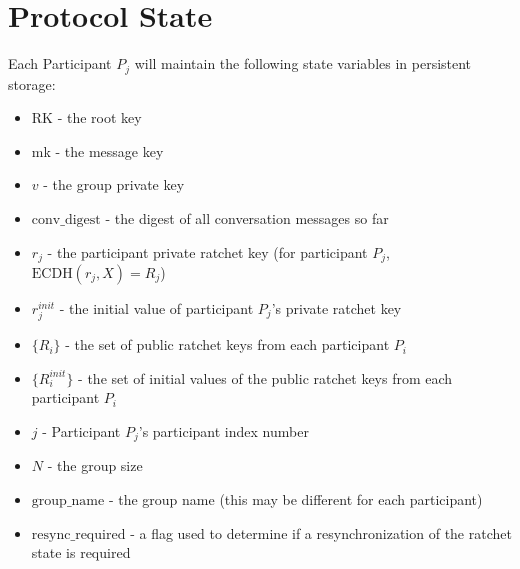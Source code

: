 \documentclass[%
preprint,
amsmath,amssymb,
aps,
prb,
floatfix,
]{revtex4-1}
\begin{document}
\section{\label{sec:protocolstate}Protocol State}
Each Participant $P_j$ will maintain the following state variables in persistent
storage:
\begin{itemize}
\item RK - the root key
\item mk - the message key
\item $v$ - the group private key
\item $\mathrm{conv\_digest}$ - the digest of all conversation messages so far
\item $r_j$ - the participant private ratchet key (for participant $P_j$,
$\mathrm{ECDH}(r_j, X) = R_j$)
\item $r_j^{init}$ - the initial value of participant $P_j$'s private ratchet
key
\item $\{R_i\}$ - the set of public ratchet keys from each participant $P_i$
\item $\{R_i^{init}\}$ - the set of initial values of the public ratchet keys from
each participant $P_i$
\item $j$ - Participant $P_j$'s participant index number
\item $N$ - the group size
\item $\mathrm{group\_name}$ - the group name (this may be different for each participant)
\item $\mathrm{resync\_required}$ - a flag used to determine if a resynchronization of the
ratchet state is required
\end{itemize}
\end{document}
